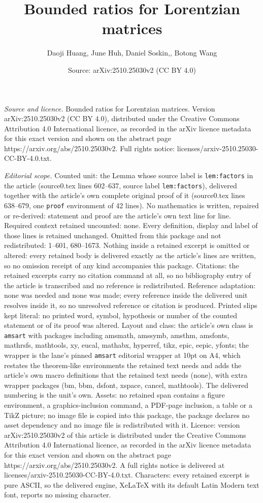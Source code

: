 \documentclass[10pt,a4paper]{amsart}
\title[Bounded ratios for Lorentzian matrices]{Bounded ratios for Lorentzian matrices}
\author{Daoji Huang, June Huh, Daniel Soskin,, Botong Wang}
\date{Source: arXiv:2510.25030v2 (CC BY 4.0)}
\begin{document}
\maketitle

\noindent\emph{Source and licence.} Bounded ratios for Lorentzian matrices. Version arXiv:2510.25030v2 (CC BY 4.0), distributed under the Creative Commons Attribution 4.0 International licence, as recorded in the arXiv licence metadata for this exact version and shown on the abstract page https://arxiv.org/abs/2510.25030v2. Full rights notice: licenses/arxiv-2510.25030-CC-BY-4.0.txt.\par\smallskip

\noindent\textit{Editorial scope.} Counted unit: the Lemma whose source label is \texttt{lem:factors} in the article (source0.tex lines 602--637, source label \texttt{lem:factors}), delivered together with the article's own complete original proof of it (source0.tex lines 638--679, one \texttt{proof} environment of 42 lines). No mathematics is written, repaired or re-derived: statement and proof are the article's own text line for line. Required context retained uncounted: none. Every definition, display and label of those lines is retained unchanged. Omitted from this package and not redistributed: 1--601, 680--1673. Nothing inside a retained excerpt is omitted or altered: every retained body is delivered exactly as the article's lines are written, so no omission receipt of any kind accompanies this package. Citations: the retained excerpts carry no citation command at all, so no bibliography entry of the article is transcribed and no reference is redistributed. Reference adaptation: none was needed and none was made; every reference inside the delivered unit resolves inside it, so no unresolved reference or citation is produced. Printed slips kept literal: no printed word, symbol, hypothesis or number of the counted statement or of its proof was altered. Layout and class: the article's own class is \texttt{amsart} with packages including amsmath, amssymb, amsthm, amsfonts, mathrsfs, mathtools, xy, eucal, mathabx, hyperref, tikz, epic, eepic, yfonts; the wrapper is the lane's pinned \texttt{amsart} editorial wrapper at 10pt on A4, which restates the theorem-like environments the retained text needs and adds the article's own macro definitions that the retained text needs (none), with extra wrapper packages (bm, bbm, dsfont, xspace, cancel, mathtools). The delivered numbering is the unit's own. Assets: no retained span contains a figure environment, a graphics-inclusion command, a PDF-page inclusion, a table or a TikZ picture; no image file is copied into this package, the package declares no asset dependency and no image file is redistributed with it. Licence: version arXiv:2510.25030v2 of this article is distributed under the Creative Commons Attribution 4.0 International licence, as recorded in the arXiv licence metadata for this exact version and shown on the abstract page https://arxiv.org/abs/2510.25030v2. A full rights notice is delivered at licenses/arxiv-2510.25030-CC-BY-4.0.txt. Characters: every retained excerpt is pure ASCII, so the delivered engine, XeLaTeX with its default Latin Modern text font, reports no missing character.
\end{document}
